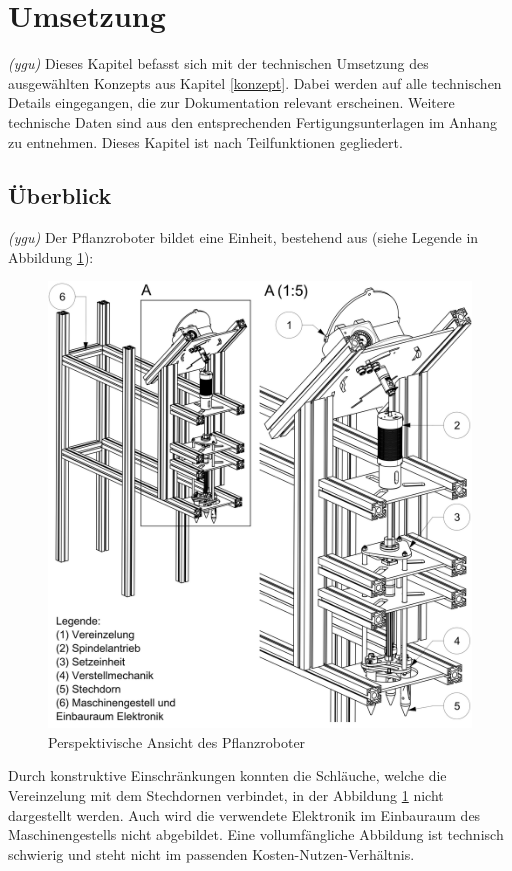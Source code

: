 \newpage
\section{Umsetzung} 
\label{kap:Umsetzung}
\textit{(ygu)} Dieses Kapitel befasst sich mit der technischen Umsetzung des ausgewählten Konzepts aus Kapitel \ref{konzept}. Dabei werden auf alle technischen Details eingegangen, die zur Dokumentation relevant erscheinen. Weitere technische Daten sind aus den entsprechenden Fertigungsunterlagen im Anhang zu entnehmen. Dieses Kapitel ist nach Teilfunktionen gegliedert. 
\subsection{Überblick}
\textit{(ygu)} Der Pflanzroboter bildet eine Einheit, bestehend aus (siehe Legende in Abbildung \ref{fig:uberblick}):
	\begin{figure}[H]
	\includegraphics[scale=0.75]{Illustrationen/6-Umsetzung/uberblick.jpg}
	\caption{Perspektivische Ansicht des Pflanzroboter}
	\label{fig:uberblick}
	\end{figure}
Durch konstruktive Einschränkungen konnten die Schläuche, welche die Vereinzelung mit dem Stechdornen verbindet, in der Abbildung \ref{fig:uberblick} nicht dargestellt werden. Auch wird die verwendete Elektronik im Einbauraum des Maschinengestells nicht  abgebildet. Eine vollumfängliche Abbildung ist technisch schwierig und steht nicht im passenden Kosten-Nutzen-Verhältnis.
